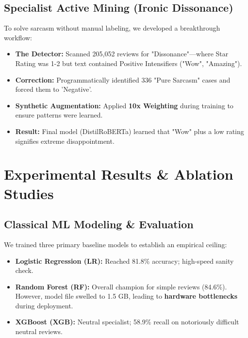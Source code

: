 \documentclass[11pt,oneside]{scrbook}
\begin{document}
\section{Specialist Active Mining (Ironic Dissonance)}
To solve sarcasm without manual labeling, we developed a breakthrough workflow:
\begin{itemize}
    \item \textbf{The Detector:} Scanned 205,052 reviews for "Dissonance"---where Star Rating was 1-2 but text contained Positive Intensifiers ("Wow", "Amazing").
    \item \textbf{Correction:} Programmatically identified 336 "Pure Sarcasm" cases and forced them to 'Negative'.
    \item \textbf{Synthetic Augmentation:} Applied \textbf{10x Weighting} during training to ensure patterns were learned.
    \item \textbf{Result:} Final model (DistilRoBERTa) learned that "Wow" plus a low rating signifies extreme disappointment.
\end{itemize}

\cleardoublepage
\chapter{Experimental Results \& Ablation Studies}

\section{Classical ML Modeling \& Evaluation}
We trained three primary baseline models to establish an empirical ceiling:
\begin{itemize}
    \item \textbf{Logistic Regression (LR):} Reached 81.8\% accuracy; high-speed sanity check.
    \item \textbf{Random Forest (RF):} Overall champion for simple reviews (84.6\%). However, model file swelled to 1.5 GB, leading to \textbf{hardware bottlenecks} during deployment.
    \item \textbf{XGBoost (XGB):} Neutral specialist; 58.9\% recall on notoriously difficult neutral reviews.
\end{itemize}
\end{document}
